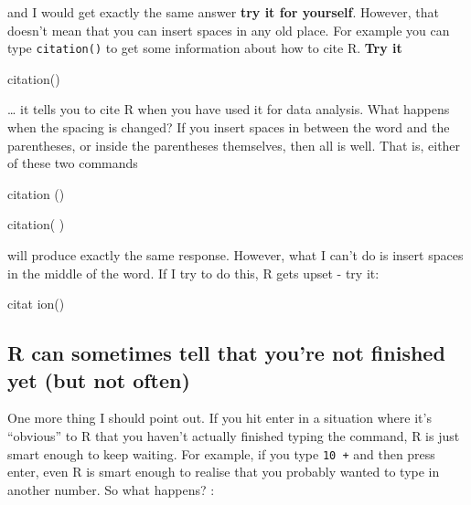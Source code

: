 \documentclass[
]{book}
\newenvironment{Shaded}{\begin{snugshade}}{\end{snugshade}}
\newcommand{\FunctionTok}[1]{\textcolor[rgb]{0.00,0.00,0.00}{#1}}
\newcommand{\NormalTok}[1]{#1}
\begin{document}
and I would get exactly the same answer \textbf{try it for yourself}. However, that doesn't mean that you can insert spaces in any old place. For example you can type \texttt{citation()} to get some information about how to cite R. \textbf{Try it}

\begin{Shaded}
\begin{Highlighting}[]
\FunctionTok{citation}\NormalTok{()}
\end{Highlighting}
\end{Shaded}

\ldots{} it tells you to cite R when you have used it for data analysis. What happens when the spacing is changed? If you insert spaces in between the word and the parentheses, or inside the parentheses themselves, then all is well. That is, either of these two commands

\begin{Shaded}
\begin{Highlighting}[]
\FunctionTok{citation}\NormalTok{ ()}
\end{Highlighting}
\end{Shaded}

\begin{Shaded}
\begin{Highlighting}[]
\FunctionTok{citation}\NormalTok{(  )}
\end{Highlighting}
\end{Shaded}

will produce exactly the same response. However, what I can't do is insert spaces in the middle of the word. If I try to do this, R gets upset - try it:

\begin{Shaded}
\begin{Highlighting}[]
\NormalTok{citat }\FunctionTok{ion}\NormalTok{()}
\end{Highlighting}
\end{Shaded}

\hypertarget{r-can-sometimes-tell-that-youre-not-finished-yet-but-not-often}{%
\subsection{R can sometimes tell that you're not finished yet (but not often)}\label{r-can-sometimes-tell-that-youre-not-finished-yet-but-not-often}}

One more thing I should point out. If you hit enter in a situation where it's ``obvious'' to R that you haven't actually finished typing the command, R is just smart enough to keep waiting. For example, if you type \texttt{10\ +} and then press enter, even R is smart enough to realise that you probably wanted to type in another number. So what happens? :
\end{document}
